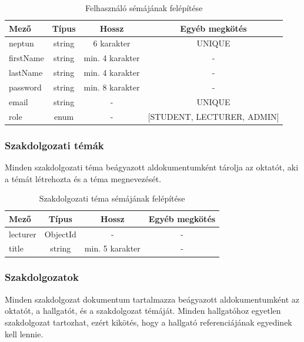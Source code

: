 \documentclass[
]{thesis-ekf}
\theoremstyle{definition}
\theoremstyle{remark}
\begin{document}
	\begin{table}[!h]
		\centering
		\begin{tabular}{|l|c|c|c|} 
			\hline
			\textbf{Mező} & \textbf{Típus} & \textbf{Hossz} & \textbf{Egyéb megkötés} \\ 
			\hline
			neptun & string & 6 karakter & UNIQUE \\ 
			\hline
			firstName & string & min. 4 karakter & - \\ 
			\hline
			lastName & string & min. 4 karakter & - \\ 
			\hline
			password & string & min. 8 karakter & - \\ 
			\hline
			email & string & - & UNIQUE \\ 
			\hline
			role & enum & - & {[}STUDENT, LECTURER, ADMIN] \\ 
			\hline
		\end{tabular}
		\caption{Felhasználó sémájának felépítése}
		\label{tbl:felhasznalo_dokumentum}
	\end{table}
	\newpage
	\subsubsection{Szakdolgozati témák}
	Minden szakdolgozati téma beágyazott aldokumentumként tárolja az oktatót, aki a témát létrehozta és a téma megnevezését.
	
	\begin{table}[!h]
		\centering
		\begin{tabular}{|l|c|c|c|} 
			\hline
			\textbf{Mező} & \textbf{Típus} & \textbf{Hossz} & \textbf{Egyéb megkötés} \\ 
			\hline
			lecturer & ObjectId & - & - \\ 
			\hline
			title & string & min. 5 karakter & - \\
			\hline
		\end{tabular}
		\caption{Szakdolgozati téma sémájának felépítése}
		\label{tbl:szakdoga_tema_dokumentum}
	\end{table}
	
	\subsubsection{Szakdolgozatok}
	Minden szakdolgozat dokumentum tartalmazza beágyazott aldokumentumként az oktatót, a hallgatót, és a szakdolgozat témáját. Minden hallgatóhoz egyetlen szakdolgozat tartozhat, ezért kikötés, hogy a hallgató referenciájának egyedinek kell lennie.
	
\end{document}
